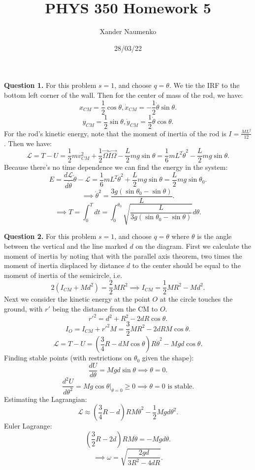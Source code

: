 \documentclass[letterpaper, reqno,11pt]{article}
\begin{document}
\title{PHYS 350 Homework 5}
\date{28/03/22}
\author{Xander Naumenko}
\maketitle

{\noindent\bf Question 1.} For this problem $s=1$, and choose $q=\theta$. We tie the IRF to the bottom left corner of the wall. Then for the center of mass of the rod, we have: 
\[
x_{CM}=\frac{1}{2}\cos\theta, \dot x_{CM}=-\frac{1}{2}\dot\theta\sin\theta
.\]
\[
y_{CM}=\frac{1}{2}\sin\theta, \dot y_{CM}=\frac{1}{2}\dot\theta\cos\theta
.\]
For the rod's kinetic energy, note that the moment of inertia of the rod is $I=\frac{ML^2}{12}$. Then we have: 
\[
\mathcal L=T-U=\frac{1}{2}mv_{CM}^2+\frac{1}{2}\vec\Omega \hat{I}\vec\Omega-\frac{L}{2}mg\sin\theta=\frac{1}{6}mL^2\dot\theta^2-\frac{L}{2}mg\sin\theta
.\]
Because there's no time dependence we can find the energy in the system: 
\[
E=\frac{d\mathcal L}{d\dot\theta}\dot \theta-\mathcal L=\frac{1}{6}mL^2\dot\theta^2+\frac{L}{2}mg\sin\theta=\frac{L}{2}mg\sin\theta_0
.\]
\[
\implies \dot\theta^2=\frac{3g(\sin\theta_0-\sin\theta)}{L}
.\]
\[
\implies T=\int_0^T dt=\int^{\theta_0}_0 \sqrt{\frac{L}{3g(\sin\theta_0-\sin\theta)}}d\theta
.\]

{\noindent\bf Question 2.} For this problem $s=1$, and choose $ q=\theta$ where $\theta$ is the angle between the vertical and the line marked $d$ on the diagram. First we calculate the moment of inertia by noting that with the parallel axis theorem, two times the moment of inertia displaced by distance $d$ to the center should be equal to the moment of inertia of the semicircle, i.e.
\[
2(I_{CM}+Md^2)=\frac{2}{2}MR^2\implies I_{CM}=\frac{1}{2}MR^2-Md^2
.\]
Next we consider the kinetic energy at the point $O$ at the circle touches the ground, with $r'$ being the distance from the CM to $O$. 
\[
r'^2=d^2+R^2-2dR\cos\theta
.\]
\[
I_O=I_{CM}+r'^2M=\frac{3}{2}MR^2-2dRM\cos\theta
.\]
\[
\mathcal L=T-U=\left( \frac{3}{4}R-dM\cos\theta \right) R\dot\theta^2-Mgd\cos\theta
.\]
Finding stable points (with restrictions on $\theta_0$ given the shape): 
\[
\frac{dU}{d\theta}=Mgd\sin\theta\implies\theta=0
.\]
\[
\frac{d^2U}{d\theta^2}=Mg\cos\theta\bigg|_{\theta=0}\geq 0\implies \theta=0\text{ is stable}
.\]
Estimating the Lagrangian: 
\[
\mathcal L\approx \left( \frac{3}{4}R-d \right) RM\ddot\theta^2-\frac{1}{2}Mgd\theta^2
.\]
Euler Lagrange: 
\[
    \left( \frac{3}{2}R-2d \right) RM\ddot\theta=-Mgd\theta
.\]
\[
\implies \omega=\sqrt{\frac{2gd}{3R^2-4dR}} 
.\]
\end{document}
